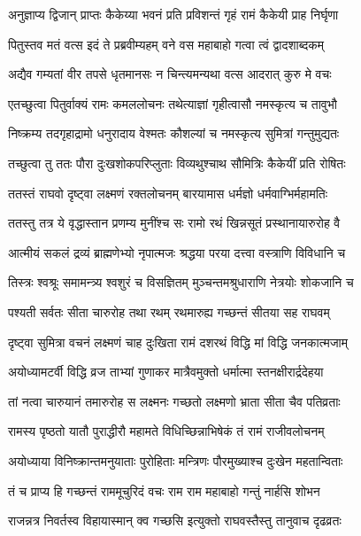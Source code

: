 \twolineshloka
{अनुज्ञाप्य द्विजान् प्राप्तः कैकेय्या भवनं प्रति}
{प्रविशन्तं गृहं रामं कैकेयी प्राह निर्घृणा} %

\twolineshloka
{पितुस्तव मतं वत्स इदं ते प्रब्रवीम्यहम्}
{वने वस महाबाहो गत्वा त्वं द्वादशाब्दकम्} %

\twolineshloka
{अद्यैव गम्यतां वीर तपसे धृतमानसः}
{न चिन्त्यमन्यथा वत्स आदरात् कुरु मे वचः} %

\twolineshloka
{एतच्छुत्वा पितुर्वाक्यं रामः कमललोचनः}
{तथेत्याज्ञां गृहीत्वासौ नमस्कृत्य च तावुभौ} %

\twolineshloka
{निष्क्रम्य तदगृहाद्रामो धनुरादाय वेश्मतः}
{कौशल्यां च नमस्कृत्य सुमित्रां गन्तुमुद्यतः} %

\twolineshloka
{तच्छुत्वा तु ततः पौरा दुःखशोकपरिप्लुताः}
{विव्यथुश्चाथ सौमित्रिः कैकेयीं प्रति रोषितः} %

\twolineshloka
{ततस्तं राघवो दृष्ट्वा लक्ष्मणं रक्तलोचनम्}
{बारयामास धर्मज्ञो धर्मवाग्भिर्महामतिः} %

\twolineshloka
{ततस्तु तत्र ये वृद्धास्तान प्रणम्य मुनींश्च सः}
{रामो रथं खिन्नसूतं प्रस्थानायारुरोह वै} %

\twolineshloka
{आत्मीयं सकलं द्रव्यं ब्राह्मणेभ्यो नृपात्मजः}
{श्रद्धया परया दत्त्वा वस्त्राणि विविधानि च} %

\twolineshloka
{तिस्त्रः श्वश्रूः समामन्त्र्य श्वशुरं च विसज्ञितम्}
{मुञ्चन्तमश्रुधाराणि नेत्रयोः शोकजानि च} %

\twolineshloka
{पश्यती सर्वतः सीता चारुरोह तथा रथम्}
{रथमारुह्य गच्छन्तं सीतया सह राघवम्} %

\twolineshloka
{दृष्ट्वा सुमित्रा वचनं लक्ष्मणं चाह दुःखिता}
{रामं दशरथं विद्धि मां विद्धि जनकात्मजाम्} %

\twolineshloka
{अयोध्यामटर्वी विद्धि व्रज ताभ्यां गुणाकर}
{मात्रैवमुक्तो धर्मात्मा स्तनक्षीरार्द्रदेहया} %

\twolineshloka
{तां नत्वा चारुयानं तमारुरोह स लक्ष्मनः}
{गच्छतो लक्ष्मणो भ्राता सीता चैव पतिव्रताः} %

\twolineshloka
{रामस्य पृष्ठतो यातौ पुराद्धीरौ महामते}
{विधिच्छिन्नाभिषेकं तं रामं राजीवलोचनम्} %

\twolineshloka
{अयोध्याया विनिष्क्रान्तमनुयाताः पुरोहिताः}
{मन्त्रिणः पौरमुख्याश्च दुःखेन महतान्विताः} %

\twolineshloka
{तं च प्राप्य हि गच्छन्तं राममूचुरिदं वचः}
{राम राम महाबाहो गन्तुं नार्हसि शोभन} %

\twolineshloka
{राजन्नत्र निवर्तस्व विहायास्मान् क्व गच्छसि}
{इत्युक्तो राघवस्तैस्तु तानुवाच दृढव्रतः} %

